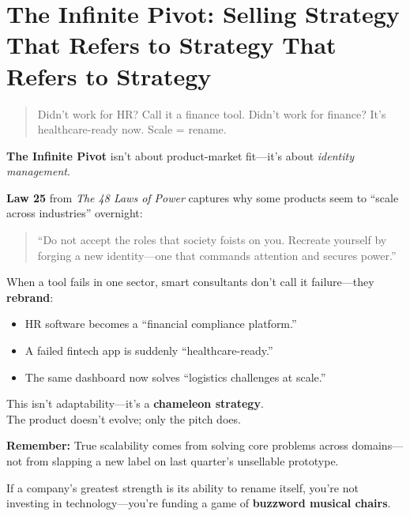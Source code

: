 \section{The Infinite Pivot: Selling Strategy That Refers to Strategy That Refers to Strategy}

\begin{quote}
Didn’t work for HR? Call it a finance tool. Didn’t work for finance? It’s healthcare-ready now. Scale = rename.
\end{quote}

  \textbf{The Infinite Pivot} isn’t about product-market fit—it’s about \textit{identity management}.
  
  \medskip
  
  \textbf{Law 25} from \textit{The 48 Laws of Power} captures why some products seem to ``scale across industries'' overnight:
  \begin{quote}
  ``Do not accept the roles that society foists on you. Recreate yourself by forging a new identity—one that commands attention and secures power.''
  \end{quote}
  
  \medskip
  
  When a tool fails in one sector, smart consultants don’t call it failure—they \textbf{rebrand}:
  
  \begin{itemize}
    \item HR software becomes a ``financial compliance platform.''
    \item A failed fintech app is suddenly ``healthcare-ready.''
    \item The same dashboard now solves ``logistics challenges at scale.''
  \end{itemize}
  
  \medskip
  
  This isn’t adaptability—it’s a \textbf{chameleon strategy}. \\
  The product doesn’t evolve; only the pitch does.
  
  \medskip
  
  \textbf{Remember:} True scalability comes from solving core problems across domains—not from slapping a new label on last quarter’s unsellable prototype.
  
  \medskip
  
  If a company’s greatest strength is its ability to rename itself, you’re not investing in technology—you’re funding a game of \textbf{buzzword musical chairs}.
  


